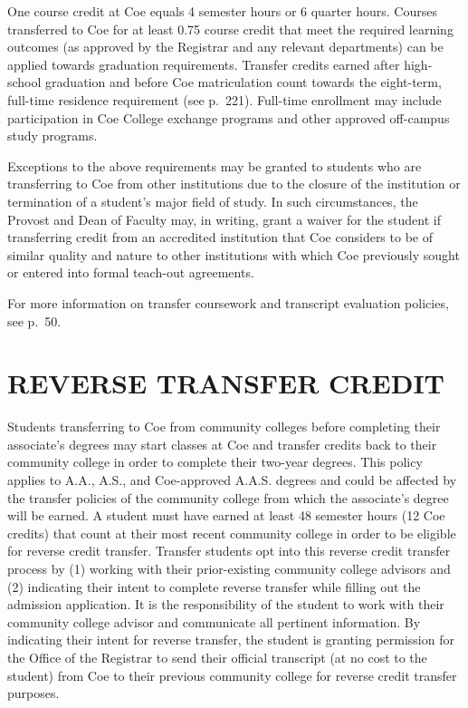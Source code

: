 \documentclass[
  letterpaper,
]{scrbook}
\begin{document}
One course credit at Coe equals 4 semester hours or 6 quarter hours.
Courses transferred to Coe for at least 0.75 course credit that meet the
required learning outcomes (as approved by the Registrar and any
relevant departments) can be applied towards graduation requirements.
Transfer credits earned after high-school graduation and before Coe
matriculation count towards the eight-term, full-time residence
requirement (see p.~221). Full-time enrollment may include participation
in Coe College exchange programs and other approved off-campus study
programs.

Exceptions to the above requirements may be granted to students who are
transferring to Coe from other institutions due to the closure of the
institution or termination of a student's major field of study. In such
circumstances, the Provost and Dean of Faculty may, in writing, grant a
waiver for the student if transferring credit from an accredited
institution that Coe considers to be of similar quality and nature to
other institutions with which Coe previously sought or entered into
formal teach-out agreements.

For more information on transfer coursework and transcript evaluation
policies, see p.~50.

\section{REVERSE TRANSFER CREDIT}\label{reverse-transfer-credit}

Students transferring to Coe from community colleges before completing
their associate's degrees may start classes at Coe and transfer credits
back to their community college in order to complete their two-year
degrees. This policy applies to A.A., A.S., and Coe-approved A.A.S.
degrees and could be affected by the transfer policies of the community
college from which the associate's degree will be earned. A student must
have earned at least 48 semester hours (12 Coe credits) that count at
their most recent community college in order to be eligible for reverse
credit transfer. Transfer students opt into this reverse credit transfer
process by (1) working with their prior-existing community college
advisors and (2) indicating their intent to complete reverse transfer
while filling out the admission application. It is the responsibility of
the student to work with their community college advisor and communicate
all pertinent information. By indicating their intent for reverse
transfer, the student is granting permission for the Office of the
Registrar to send their official transcript (at no cost to the student)
from Coe to their previous community college for reverse credit transfer
purposes.
\end{document}
